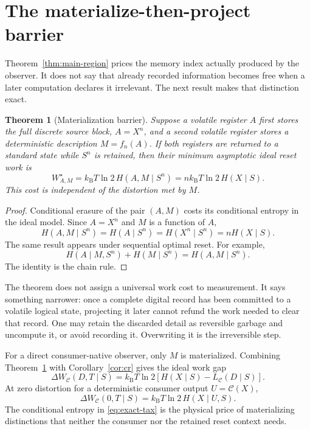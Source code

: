 \documentclass[letterpaper,onecolumn]{IEEEtran}
\newtheorem{theorem}{Theorem}
\theoremstyle{definition}
\theoremstyle{remark}
\newcommand{\cC}{\mathcal{C}}
\newcommand{\1}{\mathbf{1}}
\newcommand{\kb}{k_{\mathrm B}}
\begin{document}
\section{The materialize-then-project barrier}\label{sec:materialization}

Theorem~\ref{thm:main-region} prices the memory index actually produced by the
observer. It does not say that already recorded information becomes free when a
later computation declares it irrelevant. The next result makes that distinction
exact.

\begin{theorem}[Materialization barrier]\label{thm:materialization}
Suppose a volatile register $A$ first stores the full discrete source block,
$A=X^n$, and a second volatile register stores a deterministic description
$M=f_n(A)$. If both registers are returned to a standard state while $S^n$ is
retained, then their minimum asymptotic ideal reset work is
\begin{equation}
 W_{A,M}^{\star}
 =\kb T\ln2\,H(A,M\mid S^n)
 =n\kb T\ln2\,H(X\mid S).
 \label{eq:materialization-cost}
\end{equation}
This cost is independent of the distortion met by $M$.
\end{theorem}

\begin{proof}
Conditional erasure of the pair $(A,M)$ costs its conditional entropy in the
ideal model. Since $A=X^n$ and $M$ is a function of $A$,
\begin{equation}
 H(A,M\mid S^n)=H(A\mid S^n)=H(X^n\mid S^n)=nH(X\mid S).
\end{equation}
The same result appears under sequential optimal reset. For example,
\begin{equation}
 H(A\mid M,S^n)+H(M\mid S^n)=H(A,M\mid S^n).
\end{equation}
The identity is the chain rule.
\end{proof}

The theorem does not assign a universal work cost to measurement. It says
something narrower: once a complete digital record has been committed to a
volatile logical state, projecting it later cannot refund the work needed to
clear that record. One may retain the discarded detail as reversible garbage
and uncompute it, or avoid recording it. Overwriting it is the irreversible
step.

For a direct consumer-native observer, only $M$ is materialized. Combining
Theorem~\ref{thm:materialization} with Corollary~\ref{cor:cr} gives the ideal
work gap
\begin{equation}
 \Delta W_{\cC}(D,T\mid S)
 =\kb T\ln2\left[H(X\mid S)-L_{\cC}(D\mid S)\right].
 \label{eq:materialization-tax}
\end{equation}
At zero distortion for a deterministic consumer output $U=\cC(X)$,
\begin{equation}
 \Delta W_{\cC}(0,T\mid S)
 =\kb T\ln2\,H(X\mid U,S).
 \label{eq:exact-tax}
\end{equation}
The conditional entropy in \eqref{eq:exact-tax} is the physical price of
materializing distinctions that neither the consumer nor the retained reset
context needs.
\end{document}
